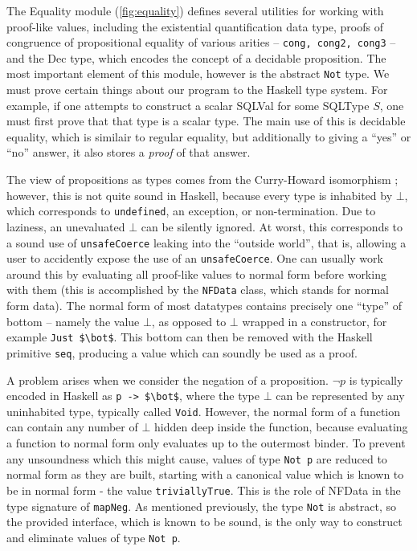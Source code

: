     
    The Equality module (\ref{fig:equality}) defines several 
    utilities for working
    with proof-like values, including the existential 
    quantification data type,
    proofs of congruence of propositional equality of various 
    arities --
    \lstinline{cong, cong2, cong3} -- and the Dec type, which 
    encodes the concept of
    a decidable proposition. The most important element of this 
    module, however is
    the abstract \lstinline{Not} type. We must prove certain 
    things about our
    program to the Haskell type system. For example, if one 
    attempts to construct a
    scalar SQLVal for some SQLType $S$, one must first prove 
    that that type is a
    scalar type. The main use of this is decidable equality, 
    which is similair to
    regular equality, but additionally to giving a ``yes'' or 
    ``no'' answer, it also
    stores a \emph{proof} of that answer.
    
    The view of propositions as types comes from the 
    Curry-Howard
    isomorphism \cite{props}; however, this is not quite sound 
    in Haskell, because
    every type is inhabited by $\bot$, which corresponds to 
    \texttt{undefined}, an
    exception, or non-termination. Due to laziness, an 
    unevaluated $\bot$ can be
    silently ignored. At worst, this corresponds to a sound use 
    of
    \lstinline{unsafeCoerce} leaking into the ``outside 
    world'', that is, allowing
    a user to accidently expose the use of an 
    \lstinline{unsafeCoerce}. One can
    usually work around this by evaluating all proof-like 
    values to normal form
    before working with them (this is accomplished by the 
    \lstinline{NFData} class,
    which stands for normal form data). The normal form of most 
    datatypes contains
    precisely one ``type'' of bottom -- namely the value 
    $\bot$, as opposed to
    $\bot$ wrapped in a constructor, for example 
    \lstinline{Just $\bot$}. This
    bottom can then be removed with the Haskell primitive 
    \lstinline{seq},
    producing a value which can soundly be used as a proof.
    
    A problem arises when we consider the negation of a 
    proposition. $\lnot p$ is
    typically encoded in Haskell as \lstinline{p -> $\bot$}, 
    where the type $\bot$
    can be represented by any uninhabited type, typically called
    \lstinline{Void}. However, the normal form of a function 
    can contain any number
    of $\bot$ hidden deep inside the function, because 
    evaluating a function to
    normal form only evaluates up to the outermost binder.  To 
    prevent any
    unsoundness which this might cause, values of type 
    \lstinline{Not p} are reduced
    to normal form as they are built, starting with a canonical 
    value which is known
    to be in normal form - the value 
    \lstinline{triviallyTrue}.  This is the role of
    NFData in the type signature of \lstinline{mapNeg}.  As 
    mentioned previously,
    the type \lstinline{Not} is abstract, so the provided 
    interface, which is known
    to be sound, is the only way to construct and eliminate 
    values of type
    \lstinline{Not p}.
    
